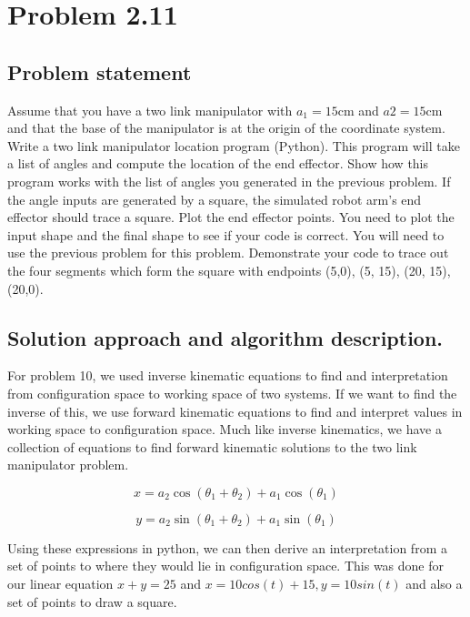 \documentclass[letterpaper,11pt]{texMemo} %
\begin{document}
\newpage
\section*{Problem 2.11}
\subsection*{Problem statement}
Assume that you have a two link manipulator with $a_1=15$cm and $a2=15$cm and that the base of the manipulator
is at the origin of the coordinate system. Write a two link manipulator location program (Python).
This program will take a list of angles and compute the location of the end effector. Show how this
program works with the list of angles you generated in the previous problem. If the angle inputs are
generated by a square, the simulated robot arm’s end effector should trace a square. Plot the end effector
points. You need to plot the input shape and the final shape to see if your code is correct. You will need
to use the previous problem for this problem. Demonstrate your code to trace out the four segments which
form the square with endpoints (5,0), (5, 15), (20, 15), (20,0).

\subsection*{Solution approach and algorithm description.}
For problem 10, we used inverse kinematic equations to find and interpretation from configuration space 
to working space of two systems. If we want to find the inverse of this, we use forward kinematic equations
to find and interpret values in working space to configuration space. Much like inverse kinematics, we have
a collection of equations to find forward kinematic solutions to the two link manipulator problem. 

\[
    x = a_2 \cos(\theta_1+\theta_2) + a_1\cos(\theta_1)
\]

\[
    y = a_2 \sin(\theta_1+\theta_2)+a_1\sin(\theta_1)
\]

Using these expressions in python, we can then derive an interpretation from a set of points to where
they would lie in configuration space. This was done for our linear equation $x+y=25$ and $x=10cos(t)+15, y=10sin(t)$ 
and also a set of points to draw a square.
\end{document}
